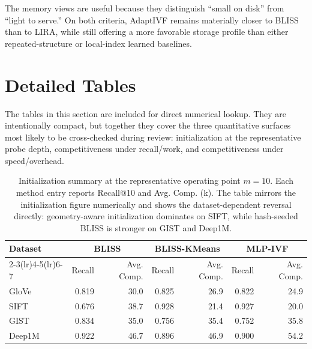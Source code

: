 \documentclass[sigconf]{acmart}
\begin{document}
\noindent The memory views are useful because they distinguish ``small on disk''
from ``light to serve.'' On both criteria, AdaptIVF remains materially closer
to BLISS than to LIRA, while still offering a more favorable storage profile
than either repeated-structure or local-index learned baselines.

\section{Detailed Tables}

\noindent The tables in this section are included for direct numerical lookup.
They are intentionally compact, but together they cover the three quantitative
surfaces most likely to be cross-checked during review: initialization at the
representative probe depth, competitiveness under recall/work, and
competitiveness under speed/overhead.

\begin{table}[!htbp]
  \centering
  \scriptsize
  \setlength{\tabcolsep}{4pt}
  \caption{Initialization summary at the representative operating point $m=10$. Each method entry reports Recall@10 and Avg. Comp. (k). The table mirrors the initialization figure numerically and shows the dataset-dependent reversal directly: geometry-aware initialization dominates on SIFT, while hash-seeded BLISS is stronger on GIST and Deep1M.}
  \label{tab:appendix:init_m10}
  \begin{tabular}{lrrrrrr}
    \toprule
    Dataset & \multicolumn{2}{c}{BLISS} & \multicolumn{2}{c}{BLISS-KMeans} & \multicolumn{2}{c}{MLP-IVF} \\
    \cmidrule(lr){2-3}\cmidrule(lr){4-5}\cmidrule(lr){6-7}
    & Recall & Avg. Comp. & Recall & Avg. Comp. & Recall & Avg. Comp. \\
    \midrule
    GloVe & 0.819 & 30.0 & 0.825 & 26.9 & 0.822 & 24.9 \\
    SIFT & 0.676 & 38.7 & 0.928 & 21.4 & 0.927 & 20.0 \\
    GIST & 0.834 & 35.0 & 0.756 & 35.4 & 0.752 & 35.8 \\
    Deep1M & 0.922 & 46.7 & 0.896 & 46.9 & 0.900 & 54.2 \\
    \bottomrule
  \end{tabular}
\end{table}
\end{document}
